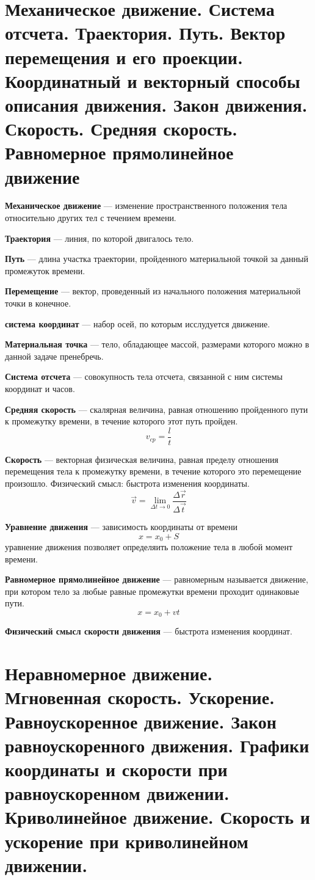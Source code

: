 \documentclass{report}
\begin{document}
\renewcommand{\partname}{Билет}
\part{Механическое движение. 
Система отсчета. 
Траектория. Путь. 
Вектор перемещения и его проекции. 
Координатный и векторный способы описания движения. 
Закон движения. 
Скорость. 
Средняя скорость. 
Равномерное прямолинейное движение}

{\bf Механическое движение} ---
изменение пространственного положения тела относительно других тел с течением времени. 

{\bf Траектория} ---
линия, по которой двигалось тело.

{\bf Путь} ---
длина участка траектории, пройденного материальной точкой за данный промежуток времени.

{\bf Перемещение} ---
вектор, проведенный из начального положения материальной точки в конечное. 

{\bf система координат} ---
набор осей, по которым исслудуется движение.

{\bf Материальная точка} ---
тело, обладающее массой, размерами которого можно в данной задаче пренебречь.

{\bf Система отсчета} ---
совокупность тела отсчета, связанной с ним системы координат и часов.

{\bf Средняя скорость} ---
скалярная величина, равная отношению пройденного пути к промежутку времени, 
в течение которого этот путь пройден. 
$$
v_{cp}=\frac{l}{t}
$$

{\bf Скорость} ---
векторная физическая величина, равная пределу отношения перемещения тела к промежутку 
времени, в течение которого это перемещение произошло.
Физический смысл: быстрота изменения координаты.
$$
\vec{v}=\lim_{\Delta t\rightarrow 0}\frac{\Delta \vec{r}}{\Delta \vec{t}}
$$

{\bf Уравнение движения} ---
зависимость координаты от времени
$$
x=x_0+S
$$
уравнение движения позволяет определяить положение тела в любой момент времени.

{\bf Равномерное прямолинейное движение} ---
равномерным называется движение, при котором тело за любые равные промежутки времени 
проходит одинаковые пути.
$$
x=x_0+vt
$$

{\bf Физический смысл скорости движения} ---
быстрота изменения координат.



\part{Неравномерное движение. 
Мгновенная скорость. 
Ускорение. 
Равноускоренное движение. 
Закон равноускоренного движения. 
Графики координаты и скорости при равноускоренном движении. 
Криволинейное движение. 
Скорость и ускорение при криволинейном движении.}
\end{document}
